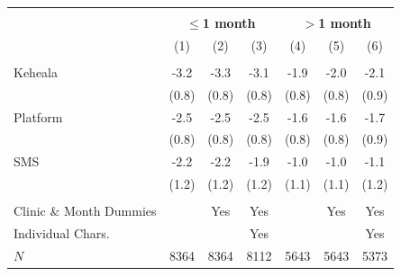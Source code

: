 \scriptsize{
\begin{tabular}{l*{6}{c}}
\hline\hline \\[-8pt]
 & \multicolumn{3}{c}{\textbf{$\leq$1 month}} & \multicolumn{3}{c}{\textbf{$>$1 month}} \\
\rowcolor{yellow!15}            &\multicolumn{1}{c}{(1)}&\multicolumn{1}{c}{(2)}&\multicolumn{1}{c}{(3)}&\multicolumn{1}{c}{(4)}&\multicolumn{1}{c}{(5)}&\multicolumn{1}{c}{(6)}\\
\hline \\[-8pt]
Keheala & -3.2\sym{***} & -3.3\sym{***} & -3.1\sym{***} & -1.9\sym{*} & -2.0\sym{*} & -2.1\sym{*} \\
            &   (0.8) &   (0.8) &   (0.8) &   (0.8) &   (0.8) &   (0.9)         \\
[0.4em]
Platform & -2.5\sym{**} & -2.5\sym{**} & -2.5\sym{**} & -1.6 & -1.6 & -1.7 \\
            &   (0.8) &   (0.8) &   (0.8) &   (0.8) &   (0.8) &   (0.9)         \\
[0.4em]
SMS & -2.2 & -2.2 & -1.9 & -1.0 & -1.0 & -1.1 \\
            &   (1.2) &   (1.2) &   (1.2) &   (1.1) &   (1.1) &   (1.2)         \\
[0.4em]
\hline
\hline \\[-8pt]
Clinic \& Month Dummies & & Yes & Yes & & Yes & Yes \\
Individual Chars. & & & Yes & & & Yes \\
\(N\)       &       8364         &       8364         &       8112         &       5643         &       5643         &       5373         \\
\hline\hline
\end{tabular}
}